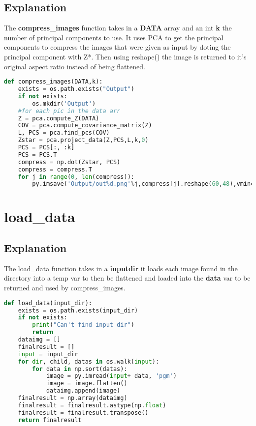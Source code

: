 \documentclass{article}
\begin{document}
\subsection{Explanation}
The \textbf{compress\_images} function takes in a \textbf{DATA} array and an int \textbf{k} the number of principal components to use. It uses PCA to get the principal components to compress the images that were given as input by doting the principal component with Z*. Then using reshape() the image is returned to it's original aspect ratio instead of being flattened. 
\begin{lstlisting}[language=Python]
def compress_images(DATA,k):
    exists = os.path.exists("Output")
    if not exists:
        os.mkdir('Output')
    #for each pic in the data arr
    Z = pca.compute_Z(DATA)
    COV = pca.compute_covariance_matrix(Z)
    L, PCS = pca.find_pcs(COV)
    Zstar = pca.project_data(Z,PCS,L,k,0)
    PCS = PCS[:, :k]
    PCS = PCS.T
    compress = np.dot(Zstar, PCS)
    compress = compress.T
    for j in range(0, len(compress)):
        py.imsave('Output/out%d.png'%j,compress[j].reshape(60,48),vmin=0,vmax=255,cmap='gray',format='png')
\end{lstlisting}

\section{load\_data}
\subsection{Explanation}
The load\_data function takes in a \textbf{inputdir} it loads each image found in the directory into a temp var to then be flattened and loaded into the \textbf{data} var to be returned and used by compress\_images.

\begin{lstlisting}[language=Python]
def load_data(input_dir):
    exists = os.path.exists(input_dir)
    if not exists:
        print("Can't find input dir")
        return 
    dataimg = []
    finalresult = []
    input = input_dir
    for dir, child, datas in os.walk(input):
        for data in np.sort(datas):
            image = py.imread(input+ data, 'pgm')
            image = image.flatten()
            dataimg.append(image)
    finalresult = np.array(dataimg)
    finalresult = finalresult.astype(np.float)
    finalresult = finalresult.transpose()
    return finalresult
\end{lstlisting}
\end{document}

